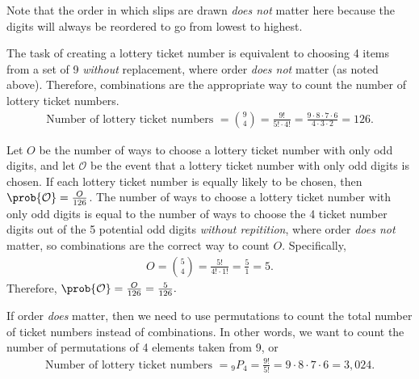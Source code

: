 \documentclass[11pt, newpage]{homework}
\begin{document}
Note that the order in which slips are drawn \textit{does not} matter here because the digits will always be reordered to go from lowest to highest.

\begin{alphaparts}
	\questionpart %
	The task of creating a lottery ticket number is equivalent to choosing 4 items from a set of 9 \textit{without} replacement, where order \textit{does not} matter (as noted above). Therefore, combinations are the appropriate way to count the number of lottery ticket numbers.
	\begin{align*}
		\text{Number of lottery ticket numbers } = \binom{9}{4} = \frac{9!}{5!\cdot4!} = \frac{9\cdot8\cdot7\cdot6}{4\cdot3\cdot2} = 126.
	\end{align*}

	\questionpart %
	Let \(O\) be the number of ways to choose a lottery ticket number with only odd digits, and let \(\mathcal{O}\) be the event that a lottery ticket number with only odd digits is chosen. If each lottery ticket number is equally likely to be chosen, then \(\prob{\mathcal{O}} = \frac{O}{126}\). The number of ways to choose a lottery ticket number with only odd digits is equal to the number of ways to choose the 4 ticket number digits out of the 5 potential odd digits \textit{without repitition}, where order \textit{does not} matter, so combinations are the correct way to count \(O\). Specifically,
	\begin{align*}
		O = \binom{5}{4} = \frac{5!}{4!\cdot1!} = \frac{5}{1} = 5.
	\end{align*}
	Therefore, \(\prob{\mathcal{O}} = \frac{O}{126} = \frac{5}{126}.\)
	
	\questionpart %
	If order \textit{does} matter, then we need to use permutations to count the total number of ticket numbers instead of combinations. In other words, we want to count the number of permutations of 4 elements taken from 9, or
	\begin{align*}
		\text{Number of lottery ticket numbers } = {}_9P_4 = \frac{9!}{5!} = 9\cdot8\cdot7\cdot6 = 3,024.
	\end{align*}
\end{alphaparts}
\end{document}
